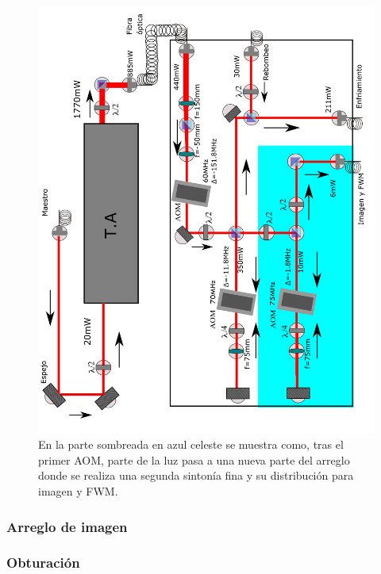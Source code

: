 \documentclass[12pt,twoside]{article}
\begin{document}
\newpage
\begin{figure}[H]
    \begin{center}
        \includegraphics[width=1.0\linewidth]{amplificadoryAOM.png}
    \end{center}
    \caption{En la parte sombreada en azul celeste se muestra como, tras el primer AOM, parte de la luz pasa a una nueva parte del arreglo donde se realiza una segunda sintonía fina y su distribución para imagen y FWM.}
    \label{arreglaom}
\end{figure} 

\subsubsection{Arreglo de imagen}\label{Arreglo de imagen}

\subsubsection{Obturación}\label{obturacion}
\end{document}
